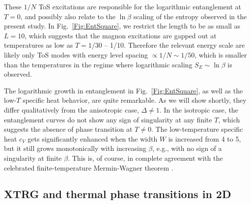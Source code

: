 \documentclass[aps,prx,twocolumn,showpacs,psfig,superscriptaddress,longbibliography]{revtex4-1}
\newcommand{\Fig}[1]{Fig.~\ref{#1}}
\begin{document}
These $1/N$ ToS excitations are responsible for the logarithmic
entanglement at $T=0$, and possibly also relate to the $\ln{\beta}$
scaling of the entropy observed in the present study.  In
\Fig{Fig:EntSquare}, we restrict the length to be as small as
$L=10$, which suggests that the magnon excitations are gapped out at
temperatures as low as $T = 1/30$ -- 1/10. Therefore the relevant
energy scale are likely only ToS modes with energy level spacing
$\propto1/N \sim 1/50$, which is smaller than the temperatures in
the regime where logarithmic scaling $S_E\sim \ln \beta$ is
observed.

The logarithmic growth in entanglement in \Fig{Fig:EntSquare},
as well as the low-$T$ specific heat behavior, are quite remarkable.
As we will show shortly, they differ qualitatively from the
anisotropic case, $\Delta \neq 1$. In the isotropic case, the
entanglement curves  {do} not show any sign of singularity at any
finite $T$,  {which} suggests the absence of phase transition at $T
\neq 0$. The low-temperature specific heat $c_V$ gets significantly
enhanced when the width $W$ is increased from 4 to 5, but it still
grows  {monotonically with} increasing $\beta$,  {e.g., with no sign of 
a singularity at finite $\beta$}.  
This is, of course, in
complete agreement with the celebrated finite-temperature
Mermin-Wagner theorem \cite{Mermin-Wagner}.

\subsection{XTRG and thermal phase transitions in 2D}
\label{sec:thermal}
\end{document}
